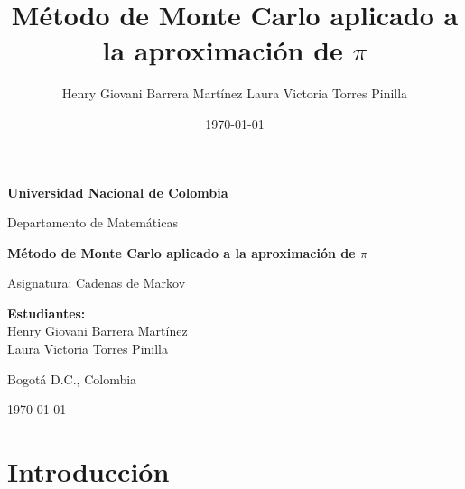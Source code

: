 \documentclass[12pt,a4paper]{article}
\title{
    \textbf{Método de Monte Carlo aplicado a la aproximación de \(\pi\)}
}
\author{
    Henry Giovani Barrera Martínez
    Laura Victoria Torres Pinilla 
}
\date{\today}
\begin{document}

\begin{titlepage}

    \centering

    \vspace*{2cm}

    {\Large \textbf{Universidad Nacional de Colombia}\par}

    \vspace{0.5cm}

    {\large Departamento de Matemáticas\par}

    \vspace{2cm}

    {\LARGE
    \textbf{Método de Monte Carlo aplicado a la aproximación de \(\pi\)}
    \par}

    \vspace{1.5cm}

    {\large Asignatura: Cadenas de Markov\par}

    \vspace{2cm}

    {\large
    \textbf{Estudiantes:}\\
        Henry Giovani Barrera Martínez\\
        Laura Victoria Torres Pinilla
    \par}

    \vfill

    {\large Bogotá D.C., Colombia\par}

    {\large \today\par}

\end{titlepage}


\tableofcontents

\newpage


\section{Introducción}
\end{document}
